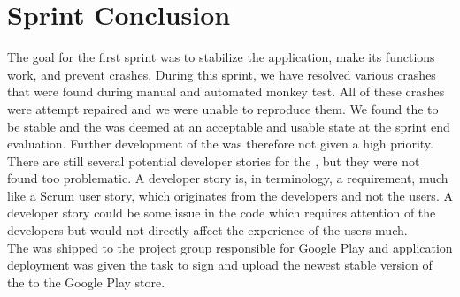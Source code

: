 
\chapter{Sprint Conclusion}
\label{cha:conclusion_sprint_1}

The goal for the first sprint was to stabilize the \launcher application, make its functions work, and prevent crashes. During this sprint, we have resolved various crashes that were found during manual and automated monkey test. All of these crashes were attempt repaired and we were unable to reproduce them. We found the \launcher to be stable and the \launcher was deemed at an acceptable and usable state at the sprint end evaluation. Further development of the \launcher was therefore not given a high priority. \\

There are still several potential developer stories for the \launcher, but they were not found too problematic. A developer story is, in \giraf terminology, a requirement, much like a Scrum user story, which originates from the developers and not the users. A developer story could be some issue in the code which requires attention of the developers but would not directly affect the experience of the users much.\\    

The \launcher was shipped to the project group responsible for Google Play and application deployment was given the task to sign and upload the newest stable version of the \launcher to the Google Play store. 






